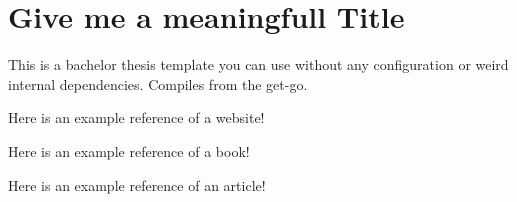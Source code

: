 \chapter{Give me a meaningfull Title}
This is a bachelor thesis template you can use without any configuration or weird internal dependencies. Compiles from the get-go.

Here is an example reference of a website! \citep{google}

Here is an example reference of a book! \citep{goetz2006java}

Here is an example reference of an article! \cite{cattell2011scalable}
